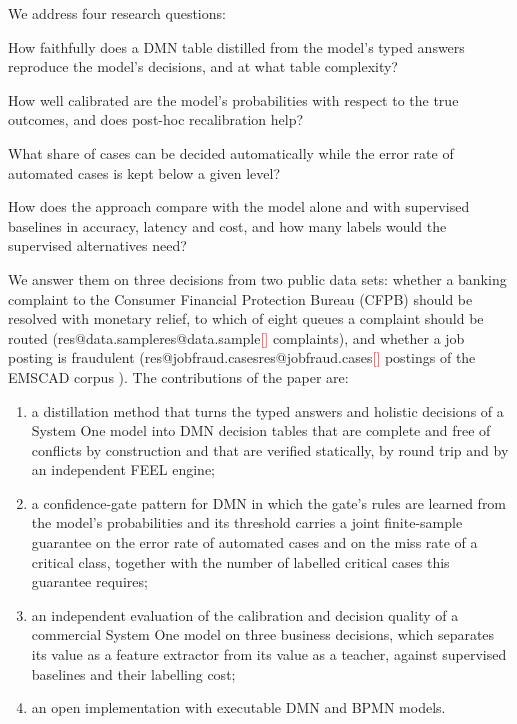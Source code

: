 \documentclass[a4paper,fleqn]{cas-sc}
\makeatletter
\theoremstyle{definition}
\newcommand{\tbd}[1]{\textcolor{red}{[\detokenize{#1}]}}
\newcommand{\res}[1]{\ifcsname res@#1\endcsname\csname res@#1\endcsname\else\tbd{#1}\fi}
\makeatother
\begin{document}
We address four research questions:
\begin{description}[leftmargin=1.2cm,labelwidth=1cm,font=\normalfont\bfseries]
  \item[RQ1] How faithfully does a DMN table distilled from the model's typed answers reproduce the model's decisions, and at what table complexity?
  \item[RQ2] How well calibrated are the model's probabilities with respect to the true outcomes, and does post-hoc recalibration help?
  \item[RQ3] What share of cases can be decided automatically while the error rate of automated cases is kept below a given level?
  \item[RQ4] How does the approach compare with the model alone and with supervised baselines in accuracy, latency and cost, and how many labels would the supervised alternatives need?
\end{description}

We answer them on three decisions from two public data sets: whether a banking complaint to the Consumer Financial Protection Bureau (CFPB) should be resolved with monetary relief, to which of eight queues a complaint should be routed (\res{data.sample} complaints), and whether a job posting is fraudulent (\res{jobfraud.cases} postings of the EMSCAD corpus \citep{vidros2017}). The contributions of the paper are:
\begin{enumerate}[label=(\arabic*)]
  \item a distillation method that turns the typed answers and holistic decisions of a System One model into DMN decision tables that are complete and free of conflicts by construction and that are verified statically, by round trip and by an independent FEEL engine;
  \item a confidence-gate pattern for DMN in which the gate's rules are learned from the model's probabilities and its threshold carries a joint finite-sample guarantee on the error rate of automated cases and on the miss rate of a critical class, together with the number of labelled critical cases this guarantee requires;
  \item an independent evaluation of the calibration and decision quality of a commercial System One model on three business decisions, which separates its value as a feature extractor from its value as a teacher, against supervised baselines and their labelling cost;
  \item an open implementation with executable DMN and BPMN models.
\end{enumerate}
\end{document}

